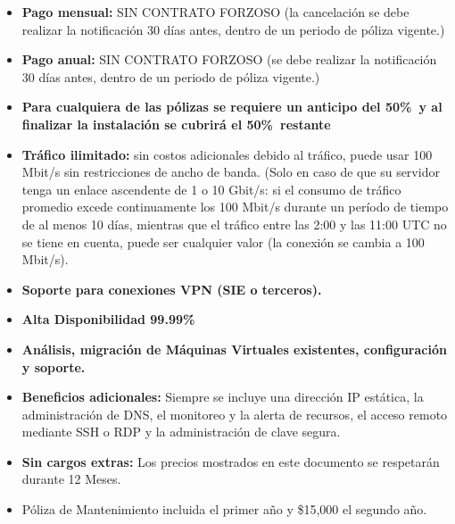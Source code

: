 \documentclass[12pt,letterpaper]{article}
\begin{document}
\begin{section}{\color{kblue}}
{ \begin{itemize}
	\item \textbf {Pago mensual:} SIN CONTRATO FORZOSO  (la cancelación se debe realizar la notificaci\'on 30 d\'ias antes, dentro de un periodo de p\'oliza vigente.)
	\item \textbf {Pago anual:} SIN CONTRATO FORZOSO  (se debe realizar la notificaci\'on 30 d\'ias antes, dentro de un periodo de p\'oliza vigente.)
	\item \textbf {Para cualquiera de las p\'olizas se requiere un anticipo del 50\%\ y al finalizar la instalaci\'on se cubrir\'a el 50\%\ restante}
	\item \textbf {Tráfico ilimitado:} sin costos adicionales debido al tráfico, puede usar 100 Mbit/s sin restricciones de ancho de banda. (Solo en caso de que su servidor tenga un enlace ascendente de 1 o 10 Gbit/s: si el consumo de tráfico promedio excede continuamente los 100 Mbit/s durante un período de tiempo de al menos 10 días, mientras que el tráfico entre las 2:00 y las 11:00 UTC no se tiene en cuenta, puede ser cualquier valor (la conexión se cambia a 100 Mbit/s).
	\item \textbf {Soporte para conexiones VPN (SIE o terceros).}
	\item \textbf {Alta Disponibilidad 99.99\%\.}
	\item \textbf {Análisis, migración de M\'aquinas Virtuales existentes, configuración y soporte.}
	\item \textbf {Beneficios adicionales:} Siempre se incluye una dirección IP estática, la administración de DNS, el monitoreo y la alerta de recursos, el acceso remoto mediante SSH o RDP y la administración de clave segura.
	\item \textbf {Sin cargos extras:} Los precios mostrados en este documento se respetar\'an durante 12 Meses.
	\item  P\'oliza de Mantenimiento incluida el primer año y \$15,000 el segundo año.
\end{itemize}

    }
  \end{section}
 
\newpage
{}
\begin{section}{\color{kblue}}
  \end{section}
\end{document}
